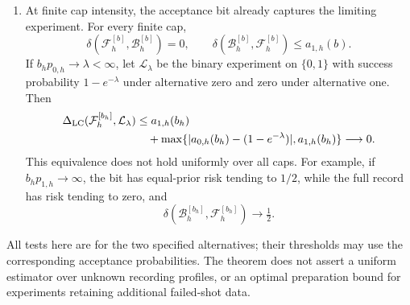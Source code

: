 \begin{theorem}
\begin{enumerate}
For sufficiently small $h$, suppress $h$ and put $p_i=p_{i,h}$, so that
$0<p_1<p_0<1$.  Define
\begin{equation}\label{eq:v55-count-threshold}
 K_b=\min\left\{b,\left\lfloor 1+
 \frac{\log(p_0/p_1)}{\log((1-p_1)/(1-p_0))}\right\rfloor\right\}.
\end{equation}
Then the exact count-only risk is
\begin{equation}\label{eq:v55-exact-count-risk}
 R_{C,h}^*(b)=\tfrac12\bigl\{(1-p_0)^{K_b}+1-(1-p_1)^{K_b}\bigr\}.
\end{equation}
Choosing either hypothesis at a likelihood tie gives the same risk.
For comparison, if $q_i$ are densities of the two terminal mark laws
with respect to a common measure $\mu$, the exact full-record risk is
\begin{equation}\label{eq:v55-full-overlap}
 R_h^*(b)=\frac12\left\{(1-p_0)^b+
 \sum_{k=1}^{b}\int
 \min\{p_0(1-p_0)^{k-1}q_0,\ p_1(1-p_1)^{k-1}q_1\}\,\dd\mu
 \right\}.
\end{equation}
Thus \eqref{eq:v55-exact-count-risk} is not asserted to be the exact
finite risk of the full record.  Bound \eqref{eq:v55-count-risk-bound}
is an absolute error bound, with no relative-error assertion for
vanishing risks.
\item At finite cap intensity, the acceptance bit already captures the
limiting experiment.  For every finite cap,
\begin{equation}\label{eq:v55-bit-simulation}
 \delta(\mathcal F_h^{[b]},\mathcal B_h^{[b]})=0,\qquad
 \delta(\mathcal B_h^{[b]},\mathcal F_h^{[b]})\le a_{1,h}(b).
\end{equation}
If $b_hp_{0,h}\to\lambda<\infty$, let $\mathcal L_\lambda$ be the
binary experiment on $\{0,1\}$ with success probability
$1-e^{-\lambda}$ under alternative zero and zero under alternative one.
Then
\begin{align}
 \Delta_{\mathrm{LC}}(\mathcal F_h^{[b_h]},\mathcal L_\lambda)
 &\le a_{1,h}(b_h)\notag\\
 &\quad+\max\{|a_{0,h}(b_h)-(1-e^{-\lambda})|,a_{1,h}(b_h)\}
 \longrightarrow0. \label{eq:v55-bit-limit}
\end{align}
This equivalence does not hold uniformly over all caps.  For example,
if $b_hp_{1,h}\to\infty$, the bit has equal-prior risk tending to
$1/2$, while the full record has risk tending to zero, and
\begin{equation}\label{eq:v55-large-cap-bit-loss}
 \delta(\mathcal B_h^{[b_h]},\mathcal F_h^{[b_h]})\longrightarrow\tfrac12.
\end{equation}
\end{enumerate}
All tests here are for the two specified alternatives; their thresholds
may use the corresponding acceptance probabilities.  The theorem does not
assert a uniform estimator over unknown recording profiles, or an optimal
preparation bound for experiments retaining additional failed-shot data.
\end{theorem}

